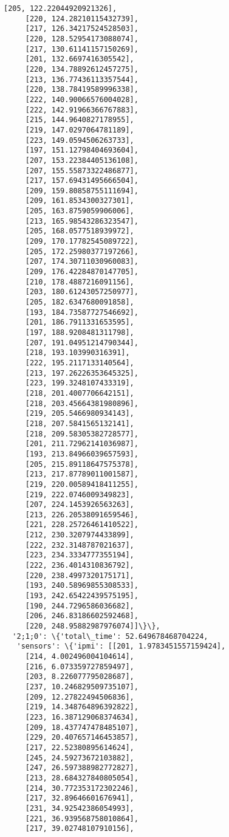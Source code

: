 \documentclass[11pt]{article}
\begin{document}
\begin{tcolorbox}[breakable, size=fbox, boxrule=.5pt, pad at break*=1mm, opacityfill=0]
\begin{Verbatim}[commandchars=\\\{\}]
     [205, 122.22044920921326],
     [220, 124.28210115432739],
     [217, 126.34217524528503],
     [220, 128.52954173088074],
     [217, 130.61141157150269],
     [201, 132.6697416305542],
     [220, 134.78892612457275],
     [213, 136.77436113357544],
     [220, 138.78419589996338],
     [222, 140.90066576004028],
     [222, 142.91966366767883],
     [215, 144.9640827178955],
     [219, 147.0297064781189],
     [223, 149.0594506263733],
     [197, 151.12798404693604],
     [207, 153.22384405136108],
     [207, 155.55873322486877],
     [217, 157.69431495666504],
     [209, 159.80858755111694],
     [209, 161.8534300327301],
     [205, 163.8759059906006],
     [213, 165.98543286323547],
     [205, 168.0577518939972],
     [209, 170.17782545089722],
     [205, 172.25980377197266],
     [207, 174.30711030960083],
     [209, 176.42284870147705],
     [210, 178.4887216091156],
     [203, 180.61243057250977],
     [205, 182.6347680091858],
     [193, 184.73587727546692],
     [201, 186.7911331653595],
     [197, 188.9208481311798],
     [207, 191.04951214790344],
     [218, 193.103990316391],
     [222, 195.2117133140564],
     [213, 197.26226353645325],
     [223, 199.3248107433319],
     [218, 201.4007706642151],
     [218, 203.45664381980896],
     [219, 205.5466980934143],
     [218, 207.5841565132141],
     [218, 209.58305382728577],
     [201, 211.72962141036987],
     [193, 213.84966039657593],
     [205, 215.89118647575378],
     [213, 217.87789011001587],
     [219, 220.00589418411255],
     [219, 222.0746009349823],
     [207, 224.1453926563263],
     [213, 226.20538091659546],
     [221, 228.25726461410522],
     [212, 230.3207974433899],
     [222, 232.3148787021637],
     [223, 234.3334777355194],
     [222, 236.4014310836792],
     [220, 238.4997320175171],
     [193, 240.58969855308533],
     [193, 242.65422439575195],
     [190, 244.7296586036682],
     [206, 246.83186602592468],
     [220, 248.95882987976074]]\}\},
  '2;1;0': \{'total\_time': 52.649678468704224,
   'sensors': \{'ipmi': [[201, 1.9783451557159424],
     [214, 4.002496004104614],
     [216, 6.073359727859497],
     [203, 8.226077795028687],
     [237, 10.246829509735107],
     [209, 12.27822494506836],
     [219, 14.348764896392822],
     [223, 16.387129068374634],
     [209, 18.437747478485107],
     [229, 20.407657146453857],
     [217, 22.52380895614624],
     [245, 24.59273672103882],
     [247, 26.597388982772827],
     [213, 28.684327840805054],
     [214, 30.772353172302246],
     [217, 32.89646601676941],
     [231, 34.92542386054993],
     [221, 36.939568758010864],
     [217, 39.02748107910156],

\end{Verbatim}
\end{tcolorbox}
\end{document}
